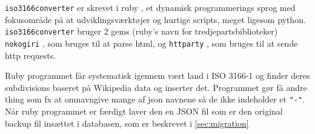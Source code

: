 \texttt{iso3166converter} er skrevet i ruby \cite{RubyLang}, et dynamisk programmerings sprog med fokusområde på at udviklingsværktøjer og hurtige scripts, meget ligesom python. \texttt{iso3166converter} bruger 2 gems (ruby's navn for tredjepartsbiblioteker) \texttt{nokogiri} \cite{nokogiri}, som bruges til at parse html, og \texttt{httparty} \cite{httparty}, som bruges til at sende http requests.

Ruby programmet får systematisk igennem vært land i ISO 3166-1 og finder deres subdivisions baseret på Wikipedia data og inserter det. Programmet gør få andre thing som fx at omnavngive mange af json navnene så de ikke indeholder et \texttt{"-"}. Når ruby programmet er færdigt laver den en JSON fil som er den original backup fil insættet i databasen, som er beskrevet i \ref{sec:migration}
